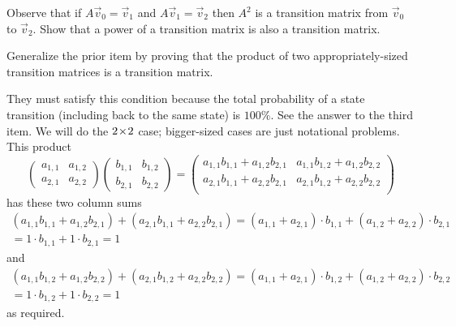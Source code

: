 \begin{exercises}
\begin{exparts}
      \item Observe that if $A\vec{v}_0=\vec{v}_1$ and $A\vec{v}_1=\vec{v}_2$
        then $A^2$ is a transition matrix from $\vec{v}_0$ to $\vec{v}_2$.
        Show that a power of a transition matrix is also a transition matrix.
      \item Generalize the prior item by  
        proving that the product of two appropriately-sized transition matrices
        is a transition matrix.
    \end{exparts}
    \begin{answer}
      \begin{exparts}
        \partsitem They must satisfy this condition because the total
          probability of a state transition (including back to the
          same state) is $100\%$.
        \partsitem See the answer to the third item.
        \partsitem We will
          do the $2 \! \times \! 2$ case; bigger-sized cases are just notational 
          problems.
          This product
          \begin{equation*}
            \begin{pmatrix}
              a_{1,1}  &a_{1,2}  \\
              a_{2,1}  &a_{2,2}  
            \end{pmatrix}
            \begin{pmatrix}
              b_{1,1}  &b_{1,2}  \\
              b_{2,1}  &b_{2,2}  
            \end{pmatrix}
            =\begin{pmatrix}
              a_{1,1}b_{1,1}+a_{1,2}b_{2,1}  &a_{1,1}b_{1,2}+a_{1,2}b_{2,2} \\
              a_{2,1}b_{1,1}+a_{2,2}b_{2,1}  &a_{2,1}b_{1,2}+a_{2,2}b_{2,2} \\
            \end{pmatrix}
           \end{equation*}
            has these two column sums
            \begin{multline*}
              (a_{1,1}b_{1,1}+a_{1,2}b_{2,1})
              +(a_{2,1}b_{1,1}+a_{2,2}b_{2,1})
              =(a_{1,1}+a_{2,1})\cdot b_{1,1}
                +(a_{1,2}+a_{2,2})\cdot b_{2,1}            \\
              =1\cdot b_{1,1}+1\cdot b_{2,1}
              =1
            \end{multline*}
            and
            \begin{multline*}
              (a_{1,1}b_{1,2}+a_{1,2}b_{2,2})
              +(a_{2,1}b_{1,2}+a_{2,2}b_{2,2})
              =(a_{1,1}+a_{2,1})\cdot b_{1,2}
                +(a_{1,2}+a_{2,2})\cdot b_{2,2}              \\
              =1\cdot b_{1,2}+1\cdot b_{2,2}
              =1
            \end{multline*}
            as required.
      \end{exparts}
    \end{answer}
\end{exercises}


